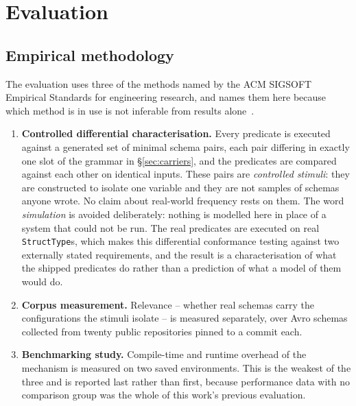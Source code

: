 \section{Evaluation}
\label{sec:evaluation}

\subsection{Empirical methodology}

The evaluation uses three of the methods named by the ACM SIGSOFT Empirical Standards for engineering research, and names them here because which method is in use is not inferable from results alone~\cite{empirical_standards}.

\begin{enumerate}[leftmargin=1.5em]
  \item \textbf{Controlled differential characterisation.} Every predicate is executed against a generated set of minimal schema pairs, each pair differing in exactly one slot of the grammar in \S\ref{sec:carriers}, and the predicates are compared against each other on identical inputs. These pairs are \emph{controlled stimuli}: they are constructed to isolate one variable and they are not samples of schemas anyone wrote. No claim about real-world frequency rests on them. The word \emph{simulation} is avoided deliberately: nothing is modelled here in place of a system that could not be run. The real predicates are executed on real \texttt{StructType}s, which makes this differential conformance testing against two externally stated requirements, and the result is a characterisation of what the shipped predicates do rather than a prediction of what a model of them would do.
  \item \textbf{Corpus measurement.} Relevance -- whether real schemas carry the configurations the stimuli isolate -- is measured separately, over Avro schemas collected from twenty public repositories pinned to a commit each.
  \item \textbf{Benchmarking study.} Compile-time and runtime overhead of the mechanism is measured on two saved environments. This is the weakest of the three and is reported last rather than first, because performance data with no comparison group was the whole of this work's previous evaluation.
\end{enumerate}


